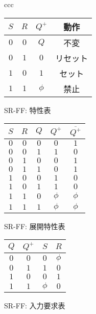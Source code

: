 \documentclass{jsarticle}
\newcommand\subcaption[1]{\begin{center}#1\end{center}}
\begin{document}
\begin{table}[htbp]
\begin{center}
\begin{tabular}{ccc}


\begin{minipage}{0.3\hsize}
\begin{center}
\begin{tabular}{cc|c||c}
\hline
$S$ & $R$ & $Q^{+}$ &  動作 \\ \hline
$0$ & $0$ & $Q$ & 不変 \\
$0$ & $1$ & $0$ & リセット \\
$1$ & $0$ & $1$ & セット \\
$1$ & $1$ & $\phi$ & 禁止 \\
\hline
\end{tabular} 
\subcaption{SR-FF: 特性表}
\end{center}
\end{minipage}

\begin{minipage}{0.3\hsize}
\begin{center}
\begin{tabular}{ccc|cc}
\hline
$S$ & $R$ & $Q$ & $Q^{+}$ & $\overline{Q^{+}}$ \\ \hline
$0$ & $0$ & $0$ & $0$ & $1$ \\
$0$ & $0$ & $1$ & $1$ & $0$ \\
$0$ & $1$ & $0$ & $0$ & $1$ \\
$0$ & $1$ & $1$ & $0$ & $1$ \\
$1$ & $0$ & $0$ & $1$ & $0$ \\
$1$ & $0$ & $1$ & $1$ & $0$ \\
$1$ & $1$ & $0$ & $\phi$ & $\phi$ \\
$1$ & $1$ & $1$ & $\phi$ & $\phi$ \\
\hline
\end{tabular} 
\subcaption{SR-FF: 展開特性表}
\end{center}
\end{minipage}

\begin{minipage}{0.3\hsize}
\begin{center}
\begin{tabular}{cc|cc}
\hline
$Q$ & $Q^{+}$ & $S$ & $R$ \\ \hline
$0$ & $0$ & $0$ & $\phi$ \\ 
$0$ & $1$ & $1$ & $0$ \\ 
$1$ & $0$ & $0$ & $1$ \\ 
$1$ & $1$ & $\phi$ & $0$ \\ 
\hline
\end{tabular} 
\subcaption{SR-FF: 入力要求表}
\end{center}
\end{minipage}


\end{tabular}
\end{center}
\end{table} 
\end{document}
